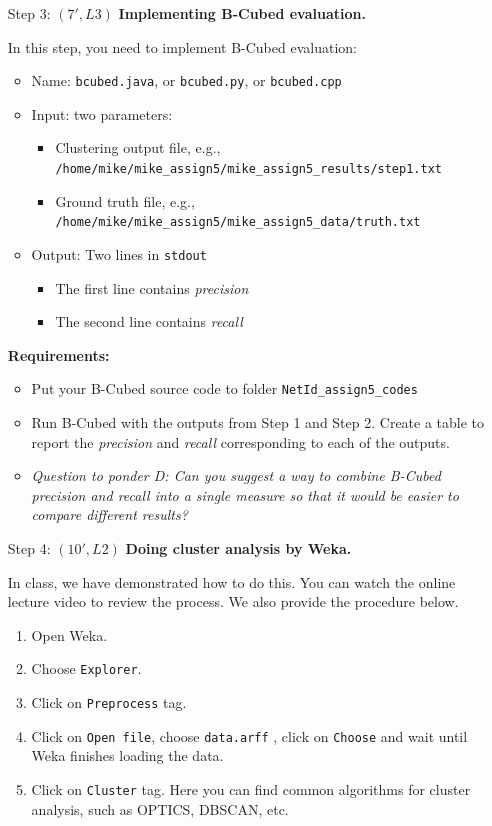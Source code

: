 \begin{enumerate}
\item[Step 3:] $(7', L3)$  \textbf{Implementing B-Cubed evaluation.}

In this step, you need to implement B-Cubed evaluation:
\begin{itemize}
\item Name: {\tt bcubed.java}, or {\tt bcubed.py}, or {\tt bcubed.cpp}
\item Input: two parameters:
\begin{itemize}
\item Clustering output file, e.g., {\tt /home/mike/mike\_assign5/mike\_assign5\_results/step1.txt}
\item Ground truth file, e.g., {\tt /home/mike/mike\_assign5/mike\_assign5\_data/truth.txt}
\end{itemize}
\item Output: Two lines in {\tt stdout}
\begin{itemize}
\item The first line contains {\it precision}
\item The second line contains {\it recall}
\end{itemize}
\end{itemize}

\textbf{Requirements:}
\begin{itemize}
\item Put your B-Cubed source code to folder {\tt NetId\_assign5\_codes}
\item Run B-Cubed with the outputs from Step 1 and Step 2. Create a table to report the {\it precision} and {\it recall} corresponding to each of the outputs.
\item \textit{Question to ponder D: Can you suggest a way to combine B-Cubed precision and recall into a single measure so that it would be easier to compare different results?}
\end{itemize}
 
\item[Step 4:] $(10', L2)$  \textbf{Doing cluster analysis by Weka.} 

In class, we have demonstrated how to do this. You can watch the online lecture video to review the process. We also provide the procedure below.

    \begin{enumerate}
	\item Open Weka.
    \item Choose \texttt{Explorer}.
    \item Click on \texttt{Preprocess} tag.
    \item Click on \texttt{Open file}, choose {\tt data.arff} , click on \texttt{Choose} and wait until Weka finishes loading the data.
    \item Click on \texttt{Cluster} tag. Here you can find common algorithms for cluster analysis, such as OPTICS, DBSCAN, etc.
    \end{enumerate}


\end{enumerate}
